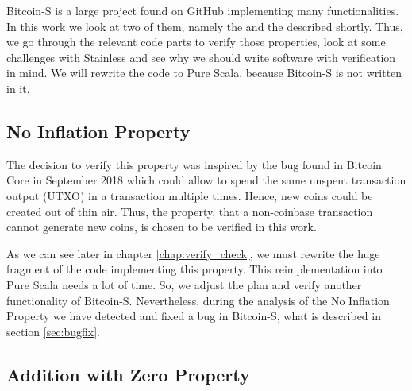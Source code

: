 Bitcoin-S is a large project found on GitHub implementing many functionalities.
In this work we look at two of them, namely the  and the  described shortly.
Thus, we go through the relevant code parts to verify those properties, look at some challenges with Stainless and see why we should write software with verification in mind.
We will rewrite the code to Pure Scala, because Bitcoin-S is not written in it.


\subsection{No Inflation Property}
\label{property_1}
The decision to verify this property was inspired by the bug found in Bitcoin Core in September 2018  \cite{cve201817144} which could allow to spend the same unspent transaction output (UTXO) in a transaction multiple times.
Hence, new coins could be created out of thin air.
Thus, the property, that a non-coinbase transaction cannot generate new coins, is chosen to be verified in this work.

As we can see later in chapter \ref{chap:verify_check}, we must rewrite the huge fragment of the code implementing this property.
This reimplementation into Pure Scala needs a lot of time.
So, we adjust the plan and verify another functionality of Bitcoin-S.
Nevertheless, during the analysis of the No Inflation Property we have detected and fixed a bug in Bitcoin-S, what is described in section \ref{sec:bugfix}. 


\subsection{Addition with Zero Property}
\label{property_2}



